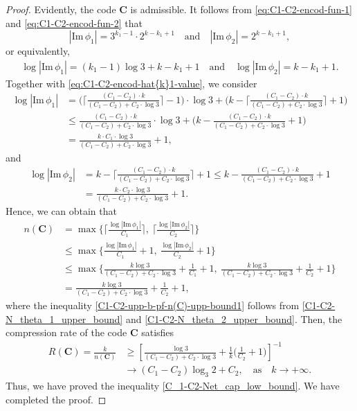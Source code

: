 \documentclass[11pt,draftclsnofoot,onecolumn]{IEEEtran}
\newcommand{\mbC}{\mathbf{C}}
\def\Im{\mathrm{Im}}
\begin{document}
{\begin{proof}
Evidently, the code $\mbC$ is admissible.
It follows from \eqref{eq:C1-C2-encod-fun-1} and \eqref{eq:C1-C2-encod-fun-2} that
\begin{equation*}
|\Im\,\phi_{1}|=3^{k_{1}-1}\cdot 2^{k-k_{1}+1}\quad\text{and}\quad |\Im\,\phi_{2}|=2^{k-k_1+1},
\end{equation*}
or equivalently,
\begin{align*}
\log|\Im\,\phi_{1}|=(k_{1}-1)\log3+k-k_{1}+1\quad\text{and}\quad
\log|\Im\,\phi_{2}|=k-k_1+1.
\end{align*}
 Together with \eqref{eq:C1-C2-encod-hat{k}1-value}, we consider
\begin{align}
\log|\Im\,\phi_{1}|&=\bigg(\bigg\lceil\frac{(C_1-C_2)\cdot k}{(C_1-C_2)+C_2\cdot\log3}\bigg\rceil-1\bigg)\cdot\log3+\bigg( k-\bigg\lceil\frac{(C_1-C_2)\cdot k}{(C_1-C_2)+C_2\cdot\log3}\bigg\rceil+1\bigg)\nonumber\\
&\leq \frac{(C_1-C_2)\cdot k}{(C_1-C_2)+C_2\cdot\log3}\cdot\log3+\bigg( k-\frac{(C_1-C_2)\cdot k}{(C_1-C_2)+C_2\cdot\log3}+1 \bigg)\nonumber\\
&= \frac{k\cdot C_1 \cdot \log3}{(C_1-C_2)+C_2\cdot\log3}+1\label{C1-C2-N_theta_1_upper_bound},
\end{align}
and
\begin{align}
\log|\Im\,\phi_{2}|&=k-\bigg\lceil\frac{(C_1-C_2)\cdot k}{(C_1-C_2)+C_2\cdot\log3}\bigg\rceil+1 \leq k-\frac{(C_1-C_2)\cdot k}{(C_1-C_2)+C_2\cdot\log3}+1\nonumber\\
&= \frac{k\cdot C_2 \cdot \log3}{(C_1-C_2)+C_2\cdot\log3}+1\label{C1-C2-N_theta_2_upper_bound}.
\end{align}
Hence, we can obtain that
\begin{align}
n(\mbC)&=\max\bigg\{\bigg\lceil\frac{\log|\Im\,\phi_{1}|}{C_1}\bigg\rceil,~\bigg\lceil\frac{\log|\Im\,\phi_{2}|}{C_2}
\bigg\rceil\bigg\}\nonumber\\
&\leq\max\bigg\{\frac{\log|\Im\,\phi_{1}|}{C_1}+1,~\frac{\log|\Im\,\phi_{2}|}{C_2}+1
\bigg\}\nonumber\\
&\leq \max\bigg\{\frac{k\log3}{(C_1-C_2)+C_2\cdot\log3}+\frac{1}{C_1}+1,
~\frac{k\log3}{(C_1-C_2)+C_2\cdot\log3}+\frac{1}{C_2}+1\bigg\}\label{C1-C2-upp-b-pf-n(C)-upp-bound1}\\
&=\frac{k\log3}{(C_1-C_2)+C_2\cdot\log3}+\frac{1}{C_2}+1,\nonumber%
\end{align}
where the inequality \eqref{C1-C2-upp-b-pf-n(C)-upp-bound1} follows from \eqref{C1-C2-N_theta_1_upper_bound} and \eqref{C1-C2-N_theta_2_upper_bound}.
 Then, the  compression rate of the  code  $\mbC$ satisfies
\begin{align}
R(\mbC)=\frac{k}{n(\mbC)} & \geq \left[\frac{\log3}{(C_1-C_2)+C_2\cdot\log3}+\frac{1}{k}\Big(\frac{1}{C_2}+1\Big)\right]^{-1}\nonumber\\
&\to (C_1-C_2)\log_{3}2+C_2, \quad \text{as} \quad k\to +\infty.\nonumber%
\end{align}
Thus, we have proved the inequality \eqref{C_1-C2-Net_cap_low_bound}. We have completed the proof.
\end{proof}


}
\end{document}
